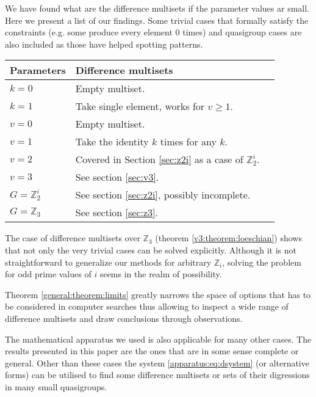 We have found what are the difference multisets if the parameter values ar small. Here we present a list of our findings. Some trivial cases that formally satisfy the constraints (e.g. some produce every element 0 times) and quasigroup cases are also included as those have helped spotting patterns.

\begin{tabular}{llr}
\toprule
    Parameters & Difference multisets \\
\midrule
    $k = 0$ & Empty multiset. \\
    $k = 1$ & Take single element, works for $v \geq 1$. \\
    $v = 0$ & Empty multiset. \\
    $v = 1$ & Take the identity $k$ times for any $k$. \\
    $v = 2$ & Covered in Section \ref{sec:z2i} as a case of $\mathbb Z_2^i$. \\
    $v = 3$ & See section \ref{sec:v3}. \\
    $G=\mathbb Z_2^i$ & See section \ref{sec:z2i}, possibly incomplete. \\
    $G=\mathbb Z_3$ & See section \ref{sec:z3}. \\
\bottomrule
\end{tabular}


The case of difference multisets over $\mathbb Z_3$ (theorem \ref{v3:theorem:loeschian}) shows that not only the very trivial cases can be solved explicitly. Although it is not straightforward to generalize our methods for arbitrary $\mathbb Z_i$, solving the problem for odd prime values of $i$ seems in the realm of possibility.

Theorem \ref{general:theorem:limits} greatly narrows the space of options that has to be considered in computer searches thus allowing to inspect a wide range of difference multisets and draw conclusions through observations.

The mathematical apparatus we used is also applicable for many other cases. The results presented in this paper are the ones that are in some sense complete or general. Other than these cases the system \eqref{apparatus:eq:dsystem} (or alternative forms) can be utilised to find some difference multisets or sets of their digressions in many small quasigroups. 

